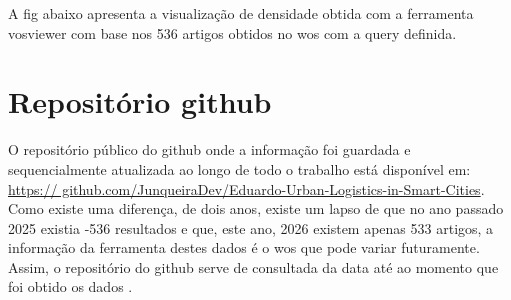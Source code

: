 A \gls{fig} abaixo apresenta a visualização de densidade obtida com a ferramenta \gls{vosviewer} com base nos 536 artigos obtidos no \gls{wos} com a query definida.
\begin{figure}[H]
    \centering
    \label{fig:vosviewer_density}
\end{figure}

\section{Repositório \gls{github}}
\label{sec:github_repository}
O repositório público do \gls{github} onde a informação foi guardada e sequencialmente atualizada ao longo de todo o trabalho está disponível em: \url{https://
github.com/JunqueiraDev/Eduardo-Urban-Logistics-in-Smart-Cities}.
Como existe uma diferença, de dois anos, existe um lapso de que no  ano passado 2025 existia -536 resultados  e que, este ano, 2026 existem apenas 533 artigos, a informação da ferramenta destes dados é o \gls{wos} que pode variar futuramente. Assim, o repositório do \gls{github} serve de consultada da data até ao momento que foi obtido os dados \cite{JunqueiraDevEduardoRepositório}.
